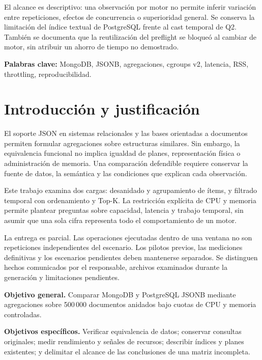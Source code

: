 \documentclass[11pt,letterpaper]{article}
\begin{document}
El alcance es descriptivo: una observación por motor no permite inferir
variación entre repeticiones, efectos de concurrencia o superioridad
general. Se conserva la limitación del índice textual de PostgreSQL
frente al cast temporal de Q2. También se documenta que la reutilización
del preflight se bloqueó al cambiar de motor, sin atribuir un ahorro
de tiempo no demostrado.

\textbf{Palabras clave:} MongoDB, JSONB, agregaciones, cgroups v2,
latencia, RSS, throttling, reproducibilidad.
\tableofcontents
\clearpage

\section*{Introducción y justificación}
El soporte JSON en sistemas relacionales y las bases orientadas a
documentos permiten formular agregaciones sobre estructuras similares.
Sin embargo, la equivalencia funcional no implica igualdad de planes,
representación física o administración de memoria. Una comparación
defendible requiere conservar la fuente de datos, la semántica y las
condiciones que explican cada observación.

Este trabajo examina dos cargas: desanidado y agrupamiento de ítems,
y filtrado temporal con ordenamiento y Top-K. La restricción explícita
de CPU y memoria permite plantear preguntas sobre capacidad, latencia
y trabajo temporal, sin asumir que una sola cifra representa todo el
comportamiento de un motor.

La entrega es parcial. Las operaciones ejecutadas dentro de una ventana
no son repeticiones independientes del escenario. Los pilotos previos,
las mediciones definitivas y los escenarios pendientes deben mantenerse
separados. Se distinguen hechos comunicados por el responsable,
archivos examinados durante la generación y limitaciones pendientes.

\textbf{Objetivo general.} Comparar MongoDB y PostgreSQL JSONB mediante
agregaciones sobre 500\,000 documentos anidados bajo cuotas de CPU y
memoria controladas.

\textbf{Objetivos específicos.} Verificar equivalencia de datos;
conservar consultas originales; medir rendimiento y señales de recursos;
describir índices y planes existentes; y delimitar el alcance de las
conclusiones de una matriz incompleta.
\end{document}
